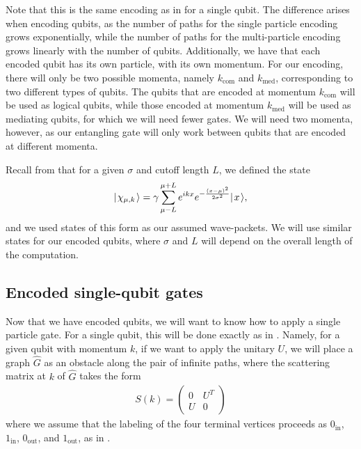 \documentclass[../thesis-main/thesis-main]{subfiles}
\begin{document}
Note that this is the same encoding as in  for a single qubit.  The difference arises when encoding qubits, as the number of paths for the single particle encoding grows exponentially, while the number of paths for the multi-particle encoding grows linearly with the number of qubits.  Additionally, we have that each encoded qubit has its own particle, with its own momentum.  For our encoding, there will only be two possible momenta, namely $k_{\text{com}}$ and $k_{\text{med}}$, corresponding to two different types of qubits.  The qubits that are encoded at momentum $k_{\text{com}}$ will be used as logical qubits, while those encoded at momentum $k_{\text{med}}$ will be used as mediating qubits, for which we will need fewer gates.  We will need two momenta, however, as our entangling gate will only work between qubits that are encoded at different momenta.



Recall from  that for a given $\sigma$ and cutoff length $L$, we defined the state
\begin{align}
  |\mspace{2mu} \chi_{\mu,k} \mspace{2mu} \rangle = \gamma \sum_{\mu - L}^{\mu + L} e^{ikx} e^{-\frac{(x-\mu)^2}{2\sigma^2}} |\mspace{2mu} x \mspace{2mu} \rangle,
\end{align}
and we used states of this form as our assumed wave-packets.  We will use similar states for our encoded qubits, where $\sigma$ and $L$ will depend on the overall length of the computation.




\subsection{Encoded single-qubit gates}

Now that we have encoded qubits, we will want to know how to apply a single particle gate.  For a single qubit, this will be done exactly as in .  Namely, for a given qubit with momentum $k$, if we want to apply the unitary $U$, we will place a graph $\widehat{G}$ as an obstacle along the pair of infinite paths, where the scattering matrix at $k$ of $\widehat{G}$ takes the form
\begin{align}
  S(k) = \begin{pmatrix}
    0& U^T\\
    U & 0
  \end{pmatrix}
\end{align}
where we assume that the labeling of the four terminal vertices proceeds as $0_{\text{in}}$, $1_{\text{in}}$, $0_{\text{out}}$, and $1_{\text{out}}$, as in . 
\end{document}
